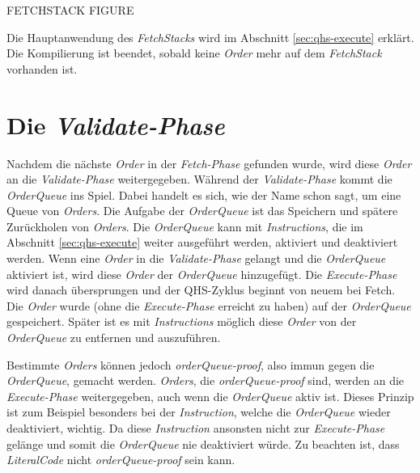 FETCHSTACK FIGURE

%
%
Die Hauptanwendung des \textit{FetchStacks} wird im Abschnitt \ref{sec:qhs-execute} erklärt.
Die Kompilierung ist beendet, sobald keine \textit{Order} mehr auf dem \textit{FetchStack} vorhanden ist.

\section{Die \textit{Validate-Phase}} \label{sec:qhs-Validate}
Nachdem die nächste \textit{Order} in der  \textit{Fetch-Phase} gefunden wurde, wird diese \textit{Order} an die \textit{Validate-Phase} weitergegeben. Während der \textit{Validate-Phase} kommt die \textit{OrderQueue} ins Spiel.
Dabei handelt es sich, wie der Name schon sagt, um eine Queue von \textit{Orders}.
Die Aufgabe der \textit{OrderQueue} ist das Speichern und spätere Zurückholen von \textit{Orders}.
Die \textit{OrderQueue} kann mit \textit{Instructions}, die im Abschnitt \ref{sec:qhs-execute} weiter ausgeführt werden, aktiviert und deaktiviert werden.
Wenn eine \textit{Order} in die \textit{Validate-Phase} gelangt und die \textit{OrderQueue} aktiviert ist, wird diese \textit{Order} der \textit{OrderQueue} hinzugefügt.
Die \textit{Execute-Phase} wird danach übersprungen und der QHS-Zyklus beginnt von neuem bei Fetch.
Die \textit{Order} wurde (ohne die \textit{Execute-Phase} erreicht zu haben) auf der \textit{OrderQueue} gespeichert.
Später ist es mit \textit{Instructions} möglich diese \textit{Order} von der \textit{OrderQueue} zu entfernen und auszuführen.

Bestimmte \textit{Orders} können jedoch \textit{orderQueue-proof}, also immun gegen die \textit{OrderQueue}, gemacht werden.
\textit{Orders}, die \textit{orderQueue-proof} sind, werden an die \textit{Execute-Phase} weitergegeben, auch wenn die \textit{OrderQueue} aktiv ist.
Dieses Prinzip ist zum Beispiel besonders bei der \textit{Instruction}, welche die \textit{OrderQueue} wieder deaktiviert, wichtig.
Da diese \textit{Instruction} ansonsten nicht zur \textit{Execute-Phase} gelänge und somit die \textit{OrderQueue} nie deaktiviert würde.
Zu beachten ist, dass \textit{LiteralCode} nicht \textit{orderQueue-proof} sein kann.

